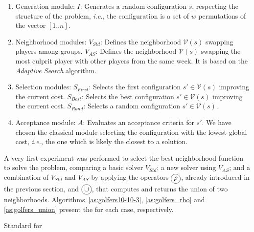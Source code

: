 \begin{enumerate}
	\item Generation module:
	\subitem $I$: Generates a random configuration $s$, respecting the structure of the problem, {\it i.e.}, the configuration is a set of $w$ permutations of the vector $[1..n]$. 
	\item Neighborhood modules:
	\subitem $V_{Std}$: Defines the neighborhood $\mathcal{V}\left(s\right)$ swapping players among groups.
	\subitem $V_{AS}$: Defines the neighborhood $\mathcal{V}\left(s\right)$ swapping the most culprit player with other players from the same week. It is based on the {\it Adaptive Search} algorithm.
	\item Selection modules:
	\subitem $S_{First}$: Selects the first configuration $s' \in \mathcal{V}\left(s\right)$ improving the current cost.
	\subitem $S_{Best}$: Selects the best configuration $s' \in \mathcal{V}\left(s\right)$ improving the current cost.
	\subitem $S_{Rand}$: Selects a random configuration $s' \in \mathcal{V}\left(s\right)$.
	\item Acceptance module:
	\subitem $A$: Evaluates an acceptance criteria for $s'$. We have chosen the classical module selecting the configuration with the lowest global cost, {\it i.e.}, the one which is likely the closest to a solution.
\end{enumerate}

A very first experiment was performed to select the best neighborhood function to solve the problem, comparing a basic solver $V_{Std}$; a new solver using $V_{AS}$; and a combination of $V_{Std}$ and $V_{AS}$ by applying the operators $\circled{$\rho$}$, already introduced in the previous section, and $\circled{$\cup$}$, that computes and returns the union of two neighborhoods. Algorithms~\ref{as:golfers10-10-3}, \ref{as:golfers_rho} and \ref{as:golfers_union} present the \as{} for each case, respectively.

\begin{algorithm}[H]
\dontprintsemicolon
\SetNoline
{}
\caption{Standard \as{} for \SGP}\label{as:golfers10-10-3}
\end{algorithm}

